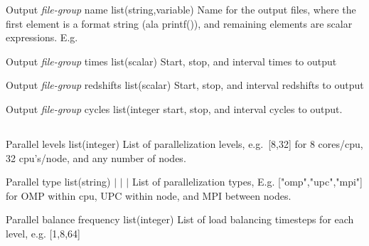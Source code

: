 \documentclass{article}
\begin{document}
\Parameter
{Output}
{\textit{file-group}}
{name}
{list(string,variable)}
{}
{Name for the output files, where the first element is a format string (ala printf()), and remaining elements are scalar expressions. E.g. \code{["wave\_pool-t=\%3.1f.data", t]}}
{}
{}

\Parameter
{Output}
{\textit{file-group}}
{times}
{list(scalar)}
{}
{Start, stop, and interval times to output}
{}
{}

\Parameter
{Output}
{\textit{file-group}}
{redshifts}
{list(scalar)}
{}
{Start, stop, and interval redshifts to output}
{}
{}

\Parameter
{Output}
{\textit{file-group}}
{cycles}
{list(integer}
{}
{start, stop, and interval cycles to output. }
{}
{}

\subsection{}

\Parameter
{Parallel}
{}
{levels}
{list(integer)}
{}
{List of parallelization levels, e.g.~[8,32] for 8 cores/cpu, 32 cpu's/node, and any number of nodes.}
{}
{}

\Parameter
{Parallel}
{}
{type}
{list(string)}
{ $|$  $|$  $|$ }
{List of parallelization types, E.g. ["omp","upc","mpi"] for OMP within cpu, UPC within node, and MPI between nodes.}
{}
{}

\Parameter
{Parallel}
{balance}
{frequency}
{list(integer)}
{}
{List of load balancing timesteps for each level, e.g. [1,8,64]}
{}
{}
\end{document}
